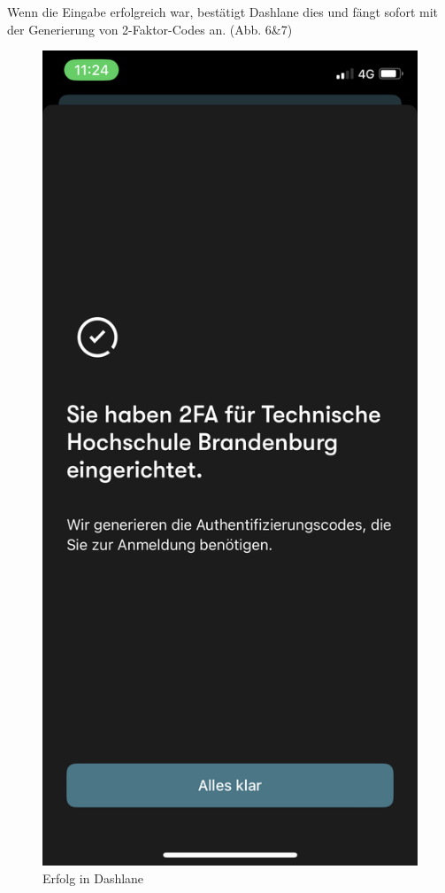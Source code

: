 \documentclass{article}
\begin{document}
Wenn die Eingabe erfolgreich war, bestätigt Dashlane dies und fängt sofort mit
der Generierung von 2-Faktor-Codes an. (Abb. 6\&7)

\begin{figure}[H]
	\includegraphics[height=0.25\textheight]{./images/06-erfolg.png}
	\centering
	\caption{Erfolg in Dashlane}
\end{figure}
\end{document}
